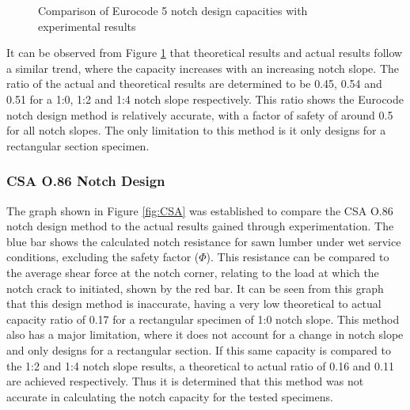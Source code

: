 \documentclass[11pt,a4paper]{article}
\numberwithin{equation}{subsection}
\begin{document}
\begin{figure}[h]
	\begin{center}
	\end{center}
	\caption{Comparison of Eurocode 5 notch design capacities with experimental results}
	\label{fig:Eurocode}
\end{figure}

It can be observed from Figure \ref{fig:Eurocode} that theoretical results and actual results follow a similar trend, where the capacity increases with an increasing notch slope. The ratio of the actual and theoretical results are determined to be 0.45, 0.54 and 0.51 for a 1:0, 1:2 and 1:4 notch slope respectively. This ratio shows the Eurocode notch design method is relatively accurate, with a factor of safety of around 0.5 for all notch slopes. The only limitation to this method is it only designs for a rectangular section specimen. 

\subsubsection{CSA O.86 Notch Design}
The graph shown in Figure \ref{fig:CSA} was established to compare the CSA O.86 notch design method to the actual results gained through experimentation. The blue bar shows the calculated notch resistance for sawn lumber under wet service conditions, excluding the safety factor ($\Phi$). This resistance can be compared to the average shear force at the notch corner, relating to the load at which the notch crack to initiated, shown by the red bar. It can be seen from this graph that this design method is inaccurate, having a very low theoretical to actual capacity ratio of 0.17 for a rectangular specimen of 1:0 notch slope. This method also has a major limitation, where it does not account for a change in notch slope and only designs for a rectangular section. If this same capacity is compared to the 1:2 and 1:4 notch slope results, a theoretical to actual ratio of 0.16 and 0.11 are achieved respectively. Thus it is determined that this method was not accurate in calculating the notch capacity for the tested specimens.
\end{document}
